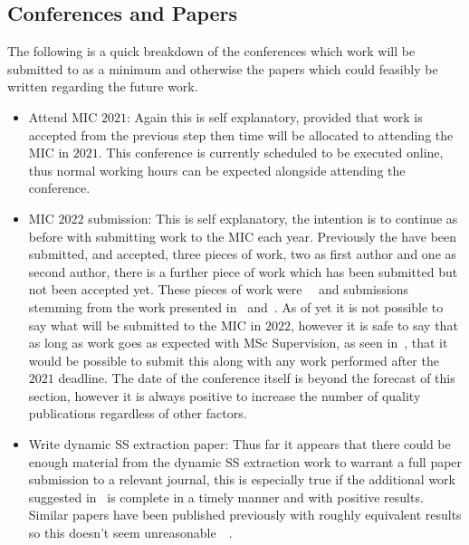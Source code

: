         \subsection{Conferences and Papers} \label{sec:future_work_conferences_and_papers}
            The following is a quick breakdown of the conferences which work will be submitted to as a minimum and otherwise the papers which could feasibly be written regarding the future work.
            
            \begin{itemize}
                \item Attend \gls{MIC} $2021$: Again this is self explanatory, provided that work is accepted from the previous step then time will be allocated to attending the \gls{MIC} in $2021$. This conference is currently scheduled to be executed online, thus normal working hours can be expected alongside attending the conference.
    
                \item \gls{MIC} $2022$ submission: This is self explanatory, the intention is to continue as before with submitting work to the \gls{MIC} each year. Previously the have been submitted, and accepted, three pieces of work, two as first author and one as second author, there is a further piece of work which has been submitted but not been accepted yet. These pieces of work were~~ and submissions stemming from the work presented in~ and~. As of yet it is not possible to say what will be submitted to the \gls{MIC} in $2022$, however it is safe to say that as long as work goes as expected with \gls{MSc} Supervision, as seen in~, that it would be possible to submit this along with any work performed after the $2021$ deadline. The date of the conference itself is beyond the forecast of this section, however it is always positive to increase the number of quality publications regardless of other factors.
                
                \item Write dynamic \gls{SS} extraction paper: Thus far it appears that there could be enough material from the dynamic \gls{SS} extraction work to warrant a full paper submission to a relevant journal, this is especially true if the additional work suggested in~ is complete in a timely manner and with positive results. Similar papers have been published previously with roughly equivalent results so this doesn't seem unreasonable~~.
                

\end{itemize}
